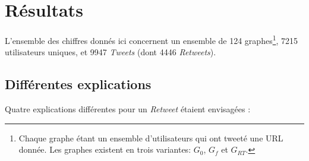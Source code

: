 \documentclass[]{article}
\begin{document}
\section{Résultats}

L'ensemble des chiffres donnés ici concernent un ensemble de 124
graphes\footnote{Chaque graphe étant un ensemble d'utilisateurs qui ont
  tweeté une URL donnée. Les graphes existent en trois variantes: $G_{0}$,
  $G_{f}$ et $G_{RT}$.}, 7215 utilisateurs uniques, et 9947 \emph{Tweets}
(dont 4446 \emph{Retweets}).

\subsection{Différentes explications}

Quatre explications différentes pour un \emph{Retweet} étaient
envisagées :
\end{document}
